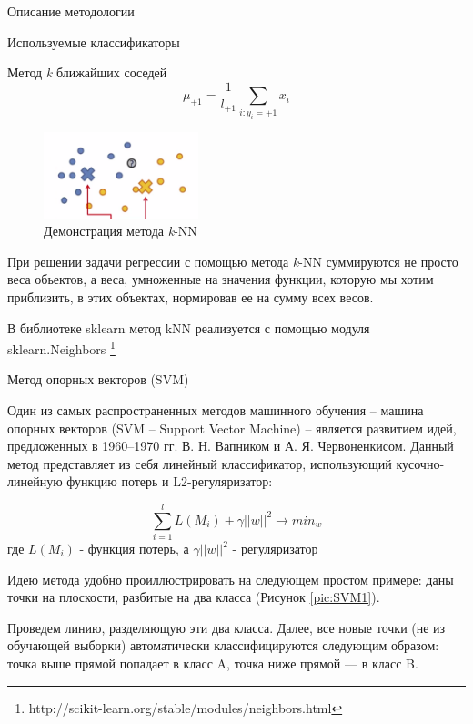\begin{section}{Описание методологии}
\begin{subsection}{Используемые классификаторы}
\begin{subsubsection}{Метод \textit{k} ближайших соседей}
\begin{equation}
\mu_{+1} = \frac{1}{l_{+1}} \sum\limits_{i: y_i = +1} x_i
\end{equation}

\begin{figure}[ht!]
\centering
\includegraphics[width=0.4\textwidth]{pics/knn4}
\caption{Демонстрация метода \textit{k}-NN}
\label{pic:knn4}
\end{figure}

При решении задачи регрессии с помощью метода \textit{k}-NN  суммируются не просто веса обьектов, а веса, умноженные на значения функции, которую мы хотим приблизить, в этих объектах, нормировав ее на сумму всех весов.

В библиотеке sklearn метод kNN реализуется с помощью модуля sklearn.Neighbors \footnote{http://scikit-learn.org/stable/modules/neighbors.html}

\end{subsubsection}

    \begin{subsubsection}{Метод опорных векторов (SVM)}

Один из самых распространенных методов машинного обучения – машина опорных векторов (SVM – Support Vector Machine) – является развитием идей, предложенных в 1960–1970 гг. В. Н. Вапником и А. Я. Червоненкисом.
Данный метод представляет из себя линейный классификатор, использующий кусочно-линейную функцию потерь и L2-регуляризатор:

\begin{equation}
\sum\limits_{i=1}^l L(M_i) + \gamma ||w||^2 \rightarrow min_{w}
\end{equation}
где $L(M_i)$ - функция потерь, а $\gamma ||w||^2$ - регуляризатор

Идею метода удобно проиллюстрировать на следующем простом примере: даны точки на плоскости, разбитые на два класса (Рисунок \ref{pic:SVM1}).

  Проведем линию, разделяющую эти два класса. Далее, все новые точки (не из обучающей выборки) автоматически классифицируются следующим образом:
точка выше прямой попадает в класс A,
точка ниже прямой — в класс B.


\end{subsubsection}
\end{subsection}
\end{section}
